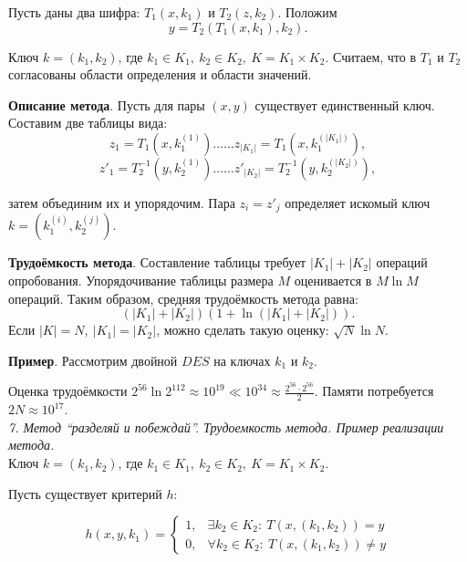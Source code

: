 Пусть даны два шифра: $T_1 (x, k_1)$ и $T_2 (z, k_2)$. Положим
$$y = T_2 (T_1 (x, k_1), k_2).$$

Ключ $k = (k_1, k_2)$, где $k_1 \in K_1,\ k_2 \in K_2,\ K = K_1 \times K_2$. Считаем, что в $T_1$ и $T_2$ согласованы области определения и области значений.

\textbf{Описание метода}. Пусть для пары $(x, y)$ существует единственный ключ. Составим две таблицы вида:
$$z_1 = T_1(x, k_1^{(1)}) \ldots \ldots z_{|K_1|} = T_1(x, k_1^{(|K_1|)}),$$
$$z'_1 = T^{-1}_2(y, k_2^{(1)}) \ldots \ldots z'_{|K_2|} = T^{-1}_2(y, k_2^{(|K_2|)}),$$

\noindent затем объединим их и упорядочим. Пара $z_i = z'_j$ определяет искомый ключ $k = (k_1^{(i)}, k_2^{(j)})$.

\textbf{Трудоёмкость метода}. Составление таблицы требует $|K_1|+|K_2|$ операций опробования. Упорядочивание таблицы размера $M$ оценивается в $M \ln M$ операций. Таким образом, средняя трудоёмкость метода равна:
$$(|K_1|+|K_2|)(1 + \ln {(|K_1|+|K_2|)}).$$
Если $|K| = N,\ |K_1| = |K_2|$, можно сделать такую оценку: $\sqrt{N} \ln N$.

\textbf{Пример}. Рассмотрим двойной $DES$ на ключах $k_1$ и $k_2$.

\medskip


\medskip

Оценка трудоёмкости $2^{56} \ln 2^{112} \approx 10^{19} \ll 10^{34} \approx \frac{2^{56} \cdot 2^{56}}{2}$. Памяти потребуется $2N \approx 10^{17}$. \\

\noindent \textit{7. Метод “разделяй и побеждай”. Трудоемкость метода. Пример реализации метода.} \\

Ключ $k = (k_1, k_2)$, где $k_1 \in K_1,\ k_2 \in K_2,\ K = K_1 \times K_2$.

Пусть существует критерий $h$:

\begin{equation*}
h(x, y, k_1) = 
\begin{cases}
  1, & \exists k_2 \in K_2:\ T(x, (k_1, k_2)) = y \\
  0, & \forall k_2 \in K_2:\ T(x, (k_1, k_2)) \ne y
\end{cases}
\end{equation*}

